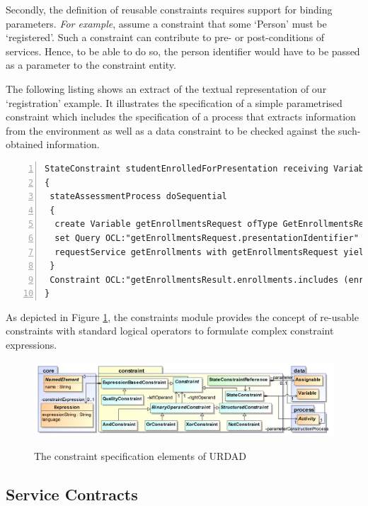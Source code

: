Secondly, the definition of reusable constraints requires support for binding parameters. \emph{For example}, assume a constraint that some `Person' must be `registered'. Such a constraint can contribute to pre- or post-conditions of services. Hence, to be able to do so, the person identifier would have to be passed as a parameter to the constraint entity. 

The following listing shows an extract of the textual representation of our `registration' example. It illustrates the specification of a simple parametrised constraint which includes the specification of a process that extracts information from the environment as well as a data constraint to be checked against the such-obtained information.
\lstset{language=urdad,caption=Specifying a state constraint in the textual URDAD DSL syntax.,label=constraintTextSyntax}
\begin{lstlisting}[numbers=left,escapechar=|]
StateConstraint studentEnrolledForPresentation receiving Variable enrollForPresentationRequest ofType EnrollForPresentationRequest
{
 stateAssessmentProcess doSequential
 {
  create Variable getEnrollmentsRequest ofType GetEnrollmentsRequest
  set Query OCL:"getEnrollmentsRequest.presentationIdentifier" equalTo Query OCL:"enrollForPresentationRequest.presentationIdentifier"
  requestService getEnrollments with getEnrollmentsRequest yielding Variable getEnrollmentsResult ofType GetEnrollmentsResult
 }
 Constraint OCL:"getEnrollmentsResult.enrollments.includes (enrollForPresentationRequest.personIdentifier)"
}
\end{lstlisting}

As depicted in Figure \ref{fig:constraintModule}, the constraints module provides the concept of re-usable constraints with standard logical operators to formulate complex constraint expressions.
\begin{figure}[thbp]
  \centering
  \includegraphics{constraint}\\   
  \caption{The constraint specification elements of URDAD}
  \label{fig:constraintModule}
\end{figure}

\subsection{Service Contracts}

